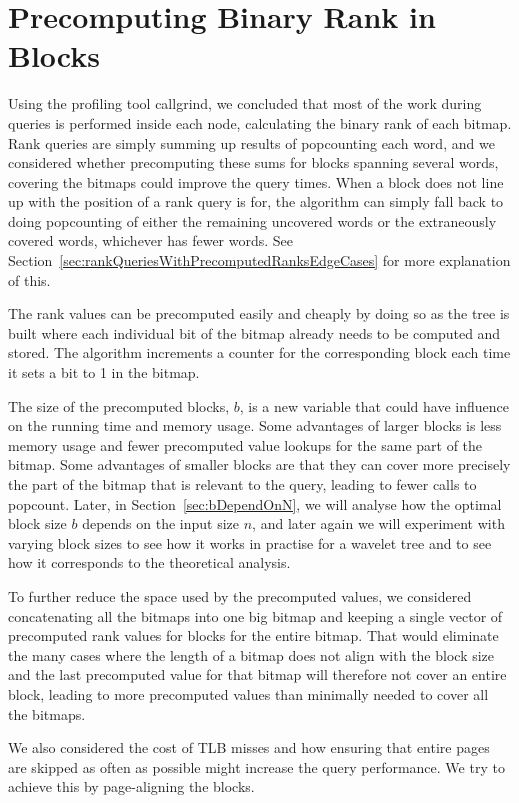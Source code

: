 \section{Precomputing Binary Rank in Blocks}
Using the profiling tool callgrind, we concluded that most of the work during queries is performed inside each node, calculating the binary rank of each bitmap.
Rank queries are simply summing up results of popcounting each word, and we considered whether precomputing these sums for blocks spanning several words, covering the bitmaps could improve the query times.
When a block does not line up with the position of a rank query is for, the algorithm can simply fall back to doing popcounting of either the remaining uncovered words or the extraneously covered words, whichever has fewer words.
See Section~\ref{sec:rankQueriesWithPrecomputedRanksEdgeCases} for more explanation of this.

The rank values can be precomputed easily and cheaply by doing so as the tree is built where each individual bit of the bitmap already needs to be computed and stored.
The algorithm increments a counter for the corresponding block each time it sets a bit to 1 in the bitmap.

The size of the precomputed blocks, $b$, is a new variable that could have influence on the running time and memory usage.
Some advantages of larger blocks is less memory usage and fewer precomputed value lookups for the same part of the bitmap.
Some advantages of smaller blocks are that they can cover more precisely the part of the bitmap that is relevant to the query, leading to fewer calls to popcount.
Later, in Section~\ref{sec:bDependOnN}, we will analyse how the optimal block size $b$ depends on the input size $n$, and later again we will experiment with varying block sizes to see how it works in practise for a wavelet tree and to see how it corresponds to the theoretical analysis.

To further reduce the space used by the precomputed values, we considered concatenating all the bitmaps into one big bitmap and keeping a single vector of precomputed rank values for blocks for the entire bitmap. 
That would eliminate the many cases where the length of a bitmap does not align with the block size and the last precomputed value for that bitmap will therefore not cover an entire block, leading to more precomputed values than minimally needed to cover all the bitmaps.

We also considered the cost of TLB misses and how ensuring that entire pages are skipped as often as possible might increase the query performance. We try to achieve this by page-aligning the blocks.

